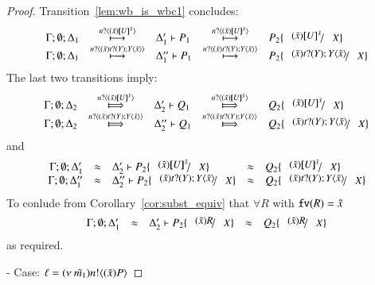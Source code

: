 \begin{proof}
	\noi Transition~\ref{lem:wb_is_wbc1} concludes:
%
\[
	\begin{array}{rclcl}
		\Gamma; \es; \Delta_1 &\hby{\bactinp{n}{(\tilde{x}) \map{U}^{\tilde{x}}}}& \Delta_1' \proves P_1 &\hby{\bactinp{n}{(\tilde{x}) \map{U}^{\tilde{x}}}}& P_2 \subst{(\tilde{x}) \map{U}^{\tilde{x}}}{X}\\
		\Gamma; \es; \Delta_1 &\hby{\bactinp{n}{(\tilde{x}) \binp{t}{Y} \appl{Y}{\tilde{x}}}}& \Delta_1'' \proves P_1 &\hby{\bactinp{n}{(\tilde{x}) \binp{t}{Y} \appl{Y}{\tilde{x}}}}& P_2 \subst{(\tilde{x}) \binp{t}{Y} \appl{Y}{\tilde{x}}}{X}
	\end{array}
\]
%
	\noi The last two transitions imply:
%
\[
	\begin{array}{rclcl}
		\Gamma; \es; \Delta_2 &\Hby{\bactinp{n}{(\tilde{x}) \map{U}^{\tilde{x}}}}& \Delta_2' \proves Q_1 &\Hby{\bactinp{n}{(\tilde{x}) \map{U}^{\tilde{x}}}}& Q_2 \subst{(\tilde{x}) \map{U}^{\tilde{x}}}{X}\\
		\Gamma; \es; \Delta_2 &\Hby{\bactinp{n}{(\tilde{x}) \binp{t}{Y} \appl{Y}{\tilde{x}}}}& \Delta_2'' \proves Q_1 &\Hby{\bactinp{n}{(\tilde{x}) \binp{t}{Y} \appl{Y}{\tilde{x}}}}& Q_2 \subst{(\tilde{x}) \binp{t}{Y} \appl{Y}{\tilde{x}}}{X}
	\end{array}
\]
%
	\noi and
\[
	\begin{array}{rclcl}
		\Gamma; \es; \Delta_1' &\wb& \Delta_2' \proves P_2 \subst{(\tilde{x}) \map{U}^{\tilde{x}}}{X} &\wb& Q_2 \subst{(\tilde{x}) \map{U}^{\tilde{x}}}{X}\\
		\Gamma; \es; \Delta_1'' &\wb& \Delta_2'' \proves P_2 \subst{(\tilde{x}) \binp{t}{Y} \appl{Y}{\tilde{x}}}{X} &\wb& Q_2 \subst{(\tilde{x}) \binp{t}{Y} \appl{Y}{\tilde{x}}}{X}
	\end{array}
\]
%
	\noi To conlude from Corollary~\ref{cor:subst_equiv} that
	$\forall R$ with $\mathtt{fv}(R) = \tilde{x}$
\[
	\begin{array}{rclcl}
		\Gamma; \es; \Delta_1' &\wb& \Delta_2' \proves P_2 \subst{(\tilde{x}) R}{X} &\wb& Q_2 \subst{(\tilde{x}) R}{X}\\
	\end{array}
\]
	\noi as required.

	\noi - Case: $\ell = (\nu\ \tilde{m_1}) n ! \langle (\tilde{x}) P \rangle$


\end{proof}
